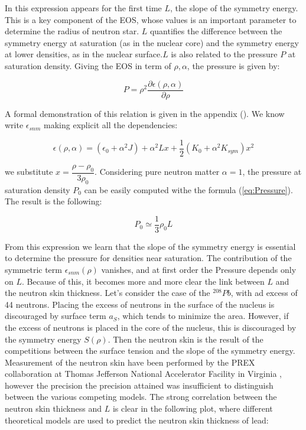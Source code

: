 In this expression appears for the first time $L$, the slope of the symmetry energy. This is a key component of the EOS, whose values is an important parameter to determine the radius of neutron star. $L$ quantifies the difference between the symmetry energy at saturation (as in the nuclear core) and the symmetry energy at lower densities, as in the nuclear surface.$L$ is also related to the pressure $P$ at saturation density. Giving the EOS in term of $\rho,\alpha$, the pressure is given by:

\begin{equation} \label{eq:Pressure}
P = \rho^{2} \dfrac{\partial \epsilon(\rho, \alpha)}{\partial \rho}
\end{equation} 

A formal demonstration of this relation is given in the appendix (). We know write $\epsilon_{snm}$ making explicit all the dependencies:

\begin{equation}
\epsilon (\rho, \alpha) = (\epsilon_{0} + \alpha^{2} J) + \alpha^{2}Lx + \frac{1}{2} (K_{0} + \alpha^{2}K_{sym})x^{2}
\end{equation}

we substitute $x = \dfrac{\rho - \rho_{0}}{3 \rho_{0}}$. Considering pure neutron matter $\alpha = 1$, the pressure at saturation density $P_{0}$ can be easily computed withe the formula (\ref{eq:Pressure}). The result is the following:

\begin{equation}
P_{0} \simeq \dfrac{1}{3}\rho_{0} L
\end{equation}

From this expression we learn that the slope of the symmetry energy is essential to determine the pressure for densities near saturation. The contribution of the symmetric term $\epsilon_{snm}(\rho)$ vanishes, and at first order the Pressure depends only on $L$. Because of this, it becomes more and more clear the link between $L$ and the neutron skin thickness. Let's consider the case of the $^{208}Pb$, with ad excess of 44 neutrons. Placing the excess of neutrons in the surface of the nucleus is discouraged by surface term $a_{S}$, which tends to minimize the area. However, if the excess of neutrons is placed in the core of the nucleus, this is discouraged by the symmetry energy $S(\rho)$.  Then the neutron skin is the result of the competitions between the surface tension and the slope of the symmetry energy. Measurement of the neutron skin have been performed by the PREX collaboration at Thomas Jefferson National Accelerator Facility in Virginia \cite{PhysRevLett.108.112502}, however the precision the precision attained was insufficient to distinguish between the various competing models. 
The strong correlation between the neutron skin thickness and $L$ is clear in the following plot, where different theoretical models are used to predict the neutron skin thickness of lead:

